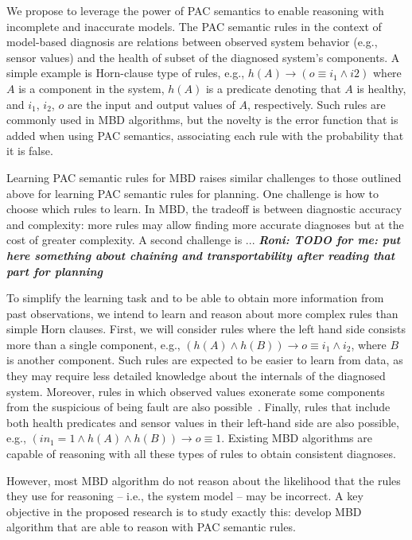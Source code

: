\documentclass[12pt]{article}
\newcommand{\note}[1]{\textbf{\textit{#1}}}
\begin{document}
We propose to leverage the power of PAC semantics to enable reasoning with incomplete and inaccurate models. The PAC semantic rules in the context of model-based diagnosis are relations between observed system behavior (e.g., sensor values) and the health of subset of the diagnosed system's components. 
A simple example is Horn-clause type of rules, e.g., $h(A)\rightarrow (o\equiv i_1 \wedge i2)$
where $A$ is a component in the system, $h(A)$ is a predicate denoting that $A$ is healthy, and $i_1$, $i_2$, $o$ are the input and output values of $A$, respectively. 
Such rules are commonly used in MBD algorithms, but the novelty is the error function that is added when using PAC semantics, associating each rule with the probability that it is false. 


Learning PAC semantic rules for MBD raises similar challenges to those outlined above for learning PAC semantic rules for planning. 
One challenge is how to choose which rules to learn. In MBD, the tradeoff is between  diagnostic accuracy and complexity: more rules may allow finding more accurate diagnoses but at the cost of greater complexity. 
A second challenge is ... \note{Roni: TODO for me: put here something about chaining and transportability after reading that part for planning}




To simplify the learning task and to be able to obtain more information from past observations, we intend to learn and reason about more complex rules than simple Horn clauses. First, we will consider rules where the left hand side consists more than a single component,  e.g., $(h(A)\wedge h(B)) \rightarrow o\equiv i_1\wedge i_2$, where $B$ is another component. Such rules are expected to be easier to learn from data, as they may require less detailed knowledge about the internals of the diagnosed system. Moreover, rules in which observed values exonerate some components from the suspicious of being fault are also possible~\cite{struss1989physical}. 
Finally, rules that include both health predicates and sensor values in their left-hand side are also possible, e.g., 
$(in_1=1 \wedge h(A) \wedge h(B))\rightarrow o\equiv 1$. Existing MBD algorithms are capable of reasoning with all these types of rules to obtain consistent diagnoses. 


However, most MBD algorithm do not reason about the likelihood that the rules they use for reasoning -- i.e., the system model -- may be incorrect. A key objective in the proposed research is to study exactly this: develop MBD algorithm that are able to reason with PAC 
semantic rules. 
\end{document}
